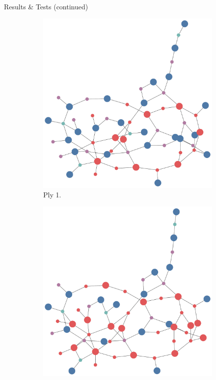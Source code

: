 \documentclass[final]{beamer} %
\begin{document}
\begin{frame}
\begin{columns}
\begin{column}{.3\textwidth}
{\begin{block}{Results \& Tests (continued)}
					\begin{figure}[!htb]
						\centering
						\begin{subfigure}[!htb]{0.24\columnwidth}
							\centering
							\includegraphics[width=\columnwidth]{figures/knn_backward_think_1.pdf}
							\caption{Ply 1.}
						\end{subfigure}
						\begin{subfigure}[!htb]{0.24\columnwidth}
							\centering
							\includegraphics[width=\columnwidth]{figures/knn_backward_think_2.pdf}

\end{subfigure}
\end{figure}
\end{block}}
\end{column}
\end{columns}
\end{frame}
\end{document}
